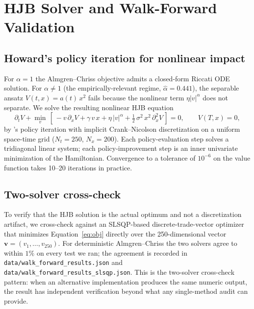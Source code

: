 \documentclass[11pt,letterpaper]{article}
\begin{document}
\section{HJB Solver and Walk-Forward Validation}
\label{sec:hjb}

\subsection{Howard's policy iteration for nonlinear impact}

For \(\alpha=1\) the Almgren--Chriss objective admits a closed-form Riccati ODE solution. For \(\alpha\neq 1\) (the empirically-relevant regime, \(\hat\alpha=0.441\)), the separable ansatz \(V(t,x)=a(t)\, x^{2}\) fails because the nonlinear term \(\eta|v|^{\alpha}\) does not separate. We solve the resulting nonlinear HJB equation
\begin{equation}
\label{eq:hjb}
\partial_t V + \min_{v}\, \left[\, -v\, \partial_x V + \gamma\, v\, x + \eta\, |v|^{\alpha} + \tfrac12\, \sigma^2\, x^2\, \partial_x^2 V\, \right] = 0,\qquad V(T,x)=0,
\end{equation}
by \citet{howard1960dynamic}'s policy iteration with implicit Crank--Nicolson discretization on a uniform space-time grid (\(N_t=250\), \(N_x=200\)). Each policy-evaluation step solves a tridiagonal linear system; each policy-improvement step is an inner univariate minimization of the Hamiltonian. Convergence to a tolerance of \(10^{-6}\) on the value function takes 10--20 iterations in practice.

\subsection{Two-solver cross-check}

To verify that the HJB solution is the actual optimum and not a discretization artifact, we cross-check against an SLSQP-based discrete-trade-vector optimizer that minimizes Equation~\ref{eq:obj} directly over the 250-dimensional vector \(\bm{v}=(v_1,\ldots,v_{250})\). For deterministic Almgren--Chriss the two solvers agree to within \(1\%\) on every test we ran; the agreement is recorded in \texttt{data/walk\_forward\_results.json} and \texttt{data/walk\_forward\_results\_slsqp.json}. This is the two-solver cross-check pattern: when an alternative implementation produces the same numeric output, the result has independent verification beyond what any single-method audit can provide.
\end{document}
